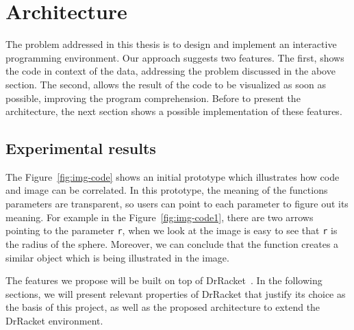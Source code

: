 
% 
% 

\section{Architecture}
\label{sec:arch}

The problem addressed in this thesis is to design and implement an interactive programming environment. Our approach suggests two features. The first, shows the code in context of the data, addressing the problem discussed in the above section. The second, allows the result of the code to be visualized as soon as possible, improving the program comprehension. Before to present the architecture, the next section shows a possible implementation of these features.

\subsection{Experimental results}

The Figure~\ref{fig:img-code} shows an initial prototype which illustrates how code and image can be correlated. In this prototype, the meaning of the functions parameters are transparent, so users can point to each parameter to figure out its meaning. For example in the Figure~\ref{fig:img-code1}, there are two arrows pointing to the parameter \texttt{r}, when we look at the image is easy to see that \texttt{r} is the radius of the sphere. Moreover, we can conclude that the function creates a similar object which is being illustrated in the image.

The features we propose will be built on top of DrRacket~\cite{findler2002drscheme}. In the following sections, we will present relevant properties of DrRacket that justify its choice as the basis of this project, as well as the proposed architecture to extend the DrRacket environment.

